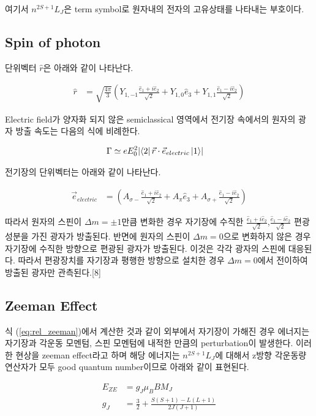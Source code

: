 \documentclass[%
 reprint,
 amsmath,amssymb,
 aps,
]{revtex4-2}
\begin{document}
여기서 $n^{2S+1}L_{J}$은 term symbol로 원자내의 전자의 고유상태를 나타내는 부호이다.

\subsection{\label{sec:level2}Spin of photon}
단위벡터 $\hat{r}$은 아래와 같이 나타난다.

\begin{align}
	\hat{r} &= \sqrt{\frac{4\pi}{3}}\left(Y_{1,-1}\frac{\hat{e}_{1}+i\hat{e}_{2}}{\sqrt{2}}+Y_{1,0}\hat{e}_{3}+Y_{1,1}\frac{\hat{e}_{1}-i\hat{e}_{2}}{\sqrt{2}}\right)
\end{align}

Electric field가 양자화 되지 않은 semiclassical 영역에서 전기장 속에서의 원자의 광자 방출 속도는 다음의 식에 비례한다.

\begin{align}
	\Gamma &\simeq eE_{0}^{2} \abs{\bra{2}\vec{r}\cdot\vec{e}_{electric}\ket{1}}
\end{align}

전기장의 단위벡터는 아래와 같이 나타난다.

\begin{align}
	\vec{e}_{electric} &= \left(A_{\sigma -}\frac{\hat{e}_{1}+i\hat{e}_{2}}{\sqrt{2}}+A_{\pi}\hat{e}_{3}+A_{\sigma +}\frac{\hat{e}_{1}-i\hat{e}_{2}}{\sqrt{2}}\right)
\end{align}

따라서 원자의 스핀이 $\Delta m = \pm 1$만큼 변화한 경우 자기장에 수직한 $\frac{\hat{e}_{1}+i\hat{e}_{2}}{\sqrt{2}}$,$\frac{\hat{e}_{1}-i\hat{e}_{2}}{\sqrt{2}}$ 편광 성분을 가진 광자가 방출된다. 반면에 원자의 스핀이 $\Delta m = 0$으로 변화하지 않은 경우 자기장에 수직한 방향으로 편광된 광자가 방출된다. 이것은 각각 광자의 스핀에 대응된다. 따라서 편광장치를 자기장과 평행한 방향으로 설치한 경우 $\Delta m = 0$에서 전이하여 방출된 광자만 관측된다.[8]

\subsection{\label{sec:level2}Zeeman Effect}
식 (\ref{eq:rel_zeeman})에서 계산한 것과 같이 외부에서 자기장이 가해진 경우 에너지는 자기장과 각운동 모멘텀, 스핀 모멘텀에 내적한 만큼의 perturbation이 발생한다. 이러한 현상을 zeeman effect라고 하며 해당 에너지는  $n^{2S+1}L_{J}$에 대해서 z방향 각운동량 연산자가 모두 good quantum number이므로 아래와 같이 표현된다.

\begin{align}
	E_{ZE} &= g_{J}\mu_{B}BM_{J}\\
	g_{J} &= \frac{3}{2} + \frac{S(S+1) - L(L+1)}{2J(J+1)}
\end{align}
\end{document}
